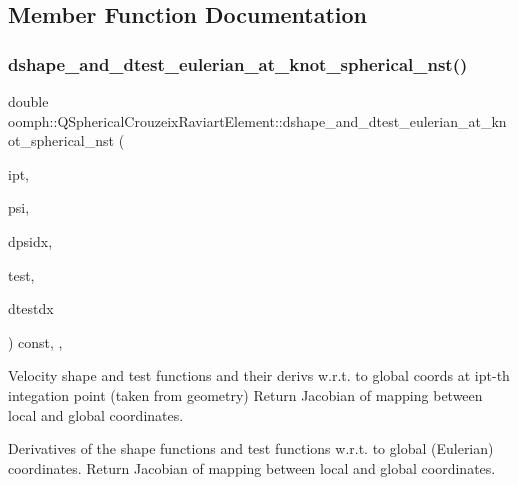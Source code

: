 \subsection{Member Function Documentation}
\mbox{\label{classoomph_1_1QSphericalCrouzeixRaviartElement_a75cdf25c724edcd05b37f5bc2c29e903}} 
\subsubsection{\texorpdfstring{dshape\+\_\+and\+\_\+dtest\+\_\+eulerian\+\_\+at\+\_\+knot\+\_\+spherical\+\_\+nst()}{dshape\_and\_dtest\_eulerian\_at\_knot\_spherical\_nst()}}
{\footnotesize\ttfamily double oomph\+::\+Q\+Spherical\+Crouzeix\+Raviart\+Element\+::dshape\+\_\+and\+\_\+dtest\+\_\+eulerian\+\_\+at\+\_\+knot\+\_\+spherical\+\_\+nst (\begin{DoxyParamCaption}\item[{const unsigned \&}]{ipt,  }\item[{\hyperlink{classoomph_1_1Shape}{Shape} \&}]{psi,  }\item[{\hyperlink{classoomph_1_1DShape}{D\+Shape} \&}]{dpsidx,  }\item[{\hyperlink{classoomph_1_1Shape}{Shape} \&}]{test,  }\item[{\hyperlink{classoomph_1_1DShape}{D\+Shape} \&}]{dtestdx }\end{DoxyParamCaption}) const\hspace{0.3cm}{\ttfamily [inline]}, {\ttfamily [protected]}, {\ttfamily [virtual]}}



Velocity shape and test functions and their derivs w.\+r.\+t. to global coords at ipt-\/th integation point (taken from geometry) Return Jacobian of mapping between local and global coordinates. 

Derivatives of the shape functions and test functions w.\+r.\+t. to global (Eulerian) coordinates. Return Jacobian of mapping between local and global coordinates. 

